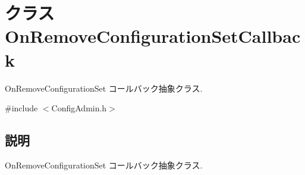 \section{クラス OnRemoveConfigurationSetCallback}
\label{classOnRemoveConfigurationSetCallback}


OnRemoveConfigurationSet コールバック抽象クラス.  




{\ttfamily \#include $<$ConfigAdmin.h$>$}



\subsection{説明}
OnRemoveConfigurationSet コールバック抽象クラス. 